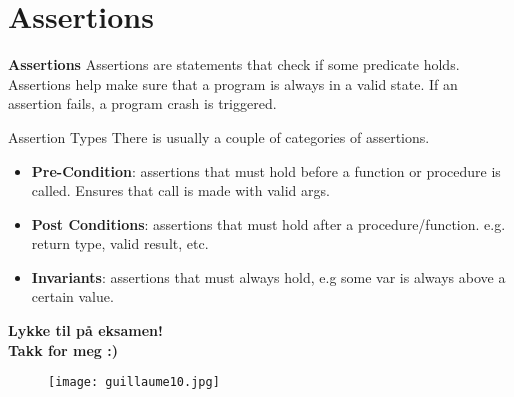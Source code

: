 
\section{Assertions}
\begin{frame}{\textbf{Assertions}}
    Assertions are statements that check if some predicate holds. 
    Assertions help make sure that a program is always in a valid state.
    If an assertion fails, a program crash is triggered.
    \begin{block}{Assertion Types}
        There is usually a couple of categories of assertions.
        \begin{itemize}
            \item \textbf{Pre-Condition}: assertions that must hold before a function or procedure is called. 
                                        Ensures that call is made with valid args.
            \item \textbf{Post Conditions}: assertions that must hold after a procedure/function.
                                           e.g. return type, valid result, etc.
            \item \textbf{Invariants}: assertions that must always hold, e.g some var is always above a certain value.
        \end{itemize}
    \end{block}
\end{frame}

\begin{frame}
    \begin{center}
        \begin{Large}
        \textbf{Lykke til på eksamen!\\[5mm]
        Takk for meg :)}
        
        \end{Large}
        \begin{figure}
            \centering
            \texttt{[image: guillaume10.jpg]}
        \end{figure}
    \end{center}  
\end{frame}